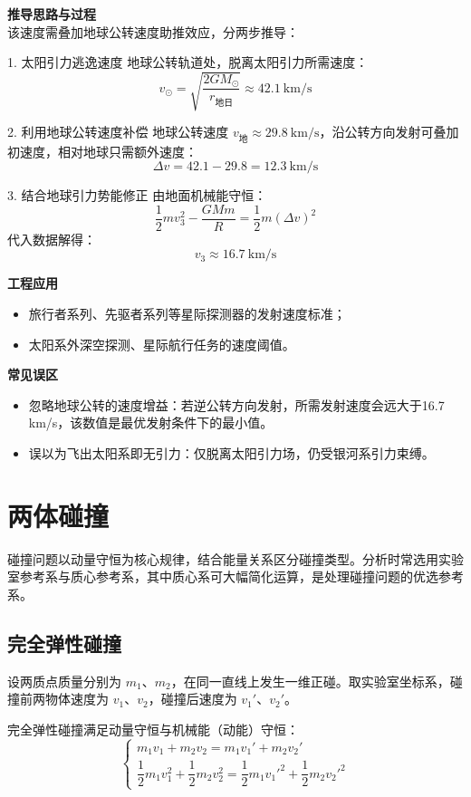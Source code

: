 \textbf{推导思路与过程\\}
该速度需叠加地球公转速度助推效应，分两步推导：

1. 太阳引力逃逸速度
地球公转轨道处，脱离太阳引力所需速度：
\[
v_{\odot} = \sqrt{\frac{2GM_{\odot}}{r_{\text{地日}}}} \approx 42.1\ \mathrm{km/s}
\]

2. 利用地球公转速度补偿
地球公转速度 \(v_{\text{地}} \approx 29.8\ \mathrm{km/s}\)，沿公转方向发射可叠加初速度，相对地球只需额外速度：
\[
\Delta v = 42.1 - 29.8 = 12.3\ \mathrm{km/s}
\]

3. 结合地球引力势能修正
由地面机械能守恒：
\[
\frac{1}{2}mv_3^2 - \frac{GMm}{R} = \frac{1}{2}m(\Delta v)^2
\]
代入数据解得：
\[
v_3 \approx 16.7\ \mathrm{km/s}
\]

\textbf{工程应用}
\begin{itemize}
    \item 旅行者系列、先驱者系列等星际探测器的发射速度标准；
    \item 太阳系外深空探测、星际航行任务的速度阈值。
\end{itemize}

\textbf{常见误区}
\begin{itemize}
    \item 忽略地球公转的速度增益：若逆公转方向发射，所需发射速度会远大于16.7 km/s，该数值是最优发射条件下的最小值。
    \item 误以为飞出太阳系即无引力：仅脱离太阳引力场，仍受银河系引力束缚。
\end{itemize}

\newpage

\section{两体碰撞}
碰撞问题以动量守恒为核心规律，结合能量关系区分碰撞类型。分析时常选用实验室参考系与质心参考系，其中质心系可大幅简化运算，是处理碰撞问题的优选参考系。

\subsection{完全弹性碰撞}
设两质点质量分别为 \(m_1\)、\(m_2\)，在同一直线上发生一维正碰。取实验室坐标系，碰撞前两物体速度为 \(v_1\)、\(v_2\)，碰撞后速度为 \(v_1'\)、\(v_2'\)。

完全弹性碰撞满足动量守恒与机械能（动能）守恒：
\[
\begin{cases}
m_1 v_1 + m_2 v_2 = m_1 v_1' + m_2 v_2' \\[4pt]
\dfrac{1}{2}m_1 v_1^2 + \dfrac{1}{2}m_2 v_2^2 = \dfrac{1}{2}m_1 {v_1'}^2 + \dfrac{1}{2}m_2 {v_2'}^2
\end{cases}
\]

